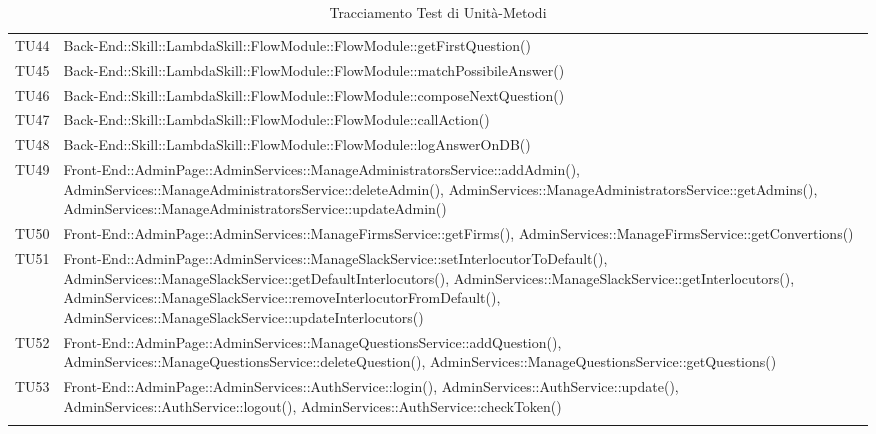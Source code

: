 \documentclass[../PianoDiQualifica_v4.0.0.tex]{subfiles}
\begin{document}
\begin{longtable}[c] { >{\centering\arraybackslash}p{} >{\centering\arraybackslash}p{}}
			\midrule
			\addlinespace[0.3em]
			TU44 & Back-End::Skill::LambdaSkill::FlowModule::FlowModule::getFirstQuestion() \\
			\addlinespace[0.3em]
			\midrule
			\addlinespace[0.3em]
			TU45 & Back-End::Skill::LambdaSkill::FlowModule::FlowModule::matchPossibileAnswer() \\
			\addlinespace[0.3em]
			\midrule
			\addlinespace[0.3em]
			TU46 & Back-End::Skill::LambdaSkill::FlowModule::FlowModule::composeNextQuestion() \\
			\addlinespace[0.3em]
			\midrule
			\addlinespace[0.3em]
			TU47 & Back-End::Skill::LambdaSkill::FlowModule::FlowModule::callAction() \\
			\addlinespace[0.3em]
			\midrule
			\addlinespace[0.3em]
			TU48 & Back-End::Skill::LambdaSkill::FlowModule::FlowModule::logAnswerOnDB() \\
			\addlinespace[0.3em]
			\midrule
			\addlinespace[0.3em]
			TU49 & Front-End::AdminPage::AdminServices::ManageAdministratorsService::addAdmin(), AdminServices::ManageAdministratorsService::deleteAdmin(), AdminServices::ManageAdministratorsService::getAdmins(), AdminServices::ManageAdministratorsService::updateAdmin() \\
			\addlinespace[0.3em]
			\midrule
			\addlinespace[0.3em]
			TU50 & Front-End::AdminPage::AdminServices::ManageFirmsService::getFirms(), AdminServices::ManageFirmsService::getConvertions() \\
			\addlinespace[0.3em]
			\midrule
			\addlinespace[0.3em]
			TU51 & Front-End::AdminPage::AdminServices::ManageSlackService::setInterlocutorToDefault(), AdminServices::ManageSlackService::getDefaultInterlocutors(), AdminServices::ManageSlackService::getInterlocutors(), AdminServices::ManageSlackService::removeInterlocutorFromDefault(), AdminServices::ManageSlackService::updateInterlocutors() \\
			\addlinespace[0.3em]
			\midrule
			\addlinespace[0.3em]
			TU52 & Front-End::AdminPage::AdminServices::ManageQuestionsService::addQuestion(), AdminServices::ManageQuestionsService::deleteQuestion(), AdminServices::ManageQuestionsService::getQuestions() \\
			\addlinespace[0.3em]
			\midrule
			\addlinespace[0.3em]
			TU53 & Front-End::AdminPage::AdminServices::AuthService::login(), AdminServices::AuthService::update(), AdminServices::AuthService::logout(), AdminServices::AuthService::checkToken() \\
			\bottomrule
			\caption{Tracciamento Test di Unità-Metodi}
	\end{longtable}
\end{document}
